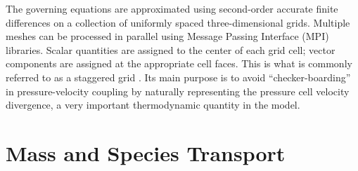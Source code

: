 The governing equations are approximated using second-order accurate finite differences on a collection of uniformly spaced three-dimensional grids. Multiple meshes can be processed in parallel using Message Passing Interface (MPI) libraries. Scalar quantities are assigned to the center of each grid cell; vector components are assigned at the appropriate cell faces. This is what is commonly referred to as a staggered grid \cite{Harlow:1}.  Its main purpose is to avoid ``checker-boarding'' in pressure-velocity coupling by naturally representing the pressure cell velocity divergence, a very important thermodynamic quantity in the model.

\section{Mass and Species Transport}
\label{sec_lumped_species}

